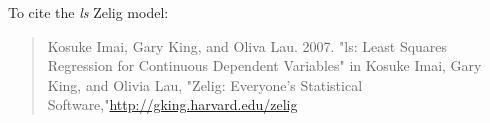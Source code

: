 To cite the \emph{ ls } Zelig model:
 \begin{verse}
 Kosuke Imai, Gary King, and Oliva Lau. 2007. "ls: Least Squares Regression for Continuous Dependent Variables" in Kosuke Imai, Gary King, and Olivia Lau, "Zelig: Everyone's Statistical Software,"\url{http://gking.harvard.edu/zelig} 
\end{verse}